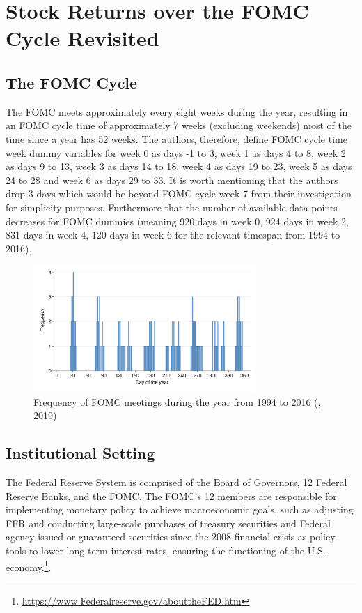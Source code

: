 \chapter{Stock Returns over the FOMC Cycle Revisited }


\section{The FOMC Cycle}

The FOMC meets approximately every eight weeks during the year,  resulting in an FOMC cycle time of approximately 7 weeks (excluding weekends) most of the time since a year has 52 weeks. The authors, therefore, define FOMC cycle time week dummy variables for week 0 as days -1 to 3, week 1 as days 4 to 8,  week 2 as days 9 to 13, week 3 as days 14 to 18, week 4 as days 19 to 23, week 5 as days 24 to 28 and week 6 as days 29 to 33. It is worth mentioning that the authors drop 3 days which would be beyond FOMC cycle week 7 from their investigation for simplicity purposes. Furthermore that the number of available data points decreases for FOMC dummies (meaning 920 days in week 0,  924 days in week 2,  831 days in week 4,  120 days in week 6 for the relevant timespan from 1994 to 2016).

\label{cies19_fig2}
\begin{figure}[h]
    \centering
    \includegraphics[width=0.75\textwidth]{figures/cies19/fig2}
    \caption{Frequency of FOMC meetings during the year from 1994 to 2016 (\cite{cieslak_stock_2019}, 2019)}
\end{figure}


\section{Institutional Setting}

The Federal Reserve System is comprised of the Board of Governors, 12 Federal Reserve Banks, and the FOMC. The FOMC's 12 members are responsible for implementing monetary policy to achieve macroeconomic goals, such as adjusting FFR and conducting large-scale purchases of treasury securities and Federal agency-issued or guaranteed securities since the 2008 financial crisis as policy tools to lower long-term interest rates, ensuring the functioning of the U.S. economy.\footnote{\url{https://www.Federalreserve.gov/abouttheFED.htm}}. 

